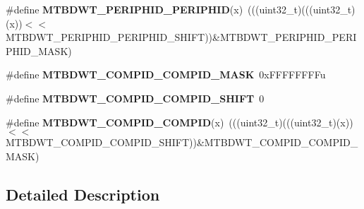 \begin{DoxyCompactItemize}
\item 
\mbox{\label{group___m_t_b_d_w_t___register___masks_ga85beaf9ed0fda0463c678867e53e691d}} 
\#define {\bfseries M\+T\+B\+D\+W\+T\+\_\+\+P\+E\+R\+I\+P\+H\+I\+D\+\_\+\+P\+E\+R\+I\+P\+H\+ID}(x)~(((uint32\+\_\+t)(((uint32\+\_\+t)(x))$<$$<$M\+T\+B\+D\+W\+T\+\_\+\+P\+E\+R\+I\+P\+H\+I\+D\+\_\+\+P\+E\+R\+I\+P\+H\+I\+D\+\_\+\+S\+H\+I\+FT))\&M\+T\+B\+D\+W\+T\+\_\+\+P\+E\+R\+I\+P\+H\+I\+D\+\_\+\+P\+E\+R\+I\+P\+H\+I\+D\+\_\+\+M\+A\+SK)
\item 
\mbox{\label{group___m_t_b_d_w_t___register___masks_ga6b80c05493bf46a1572b3f25fda4764b}} 
\#define {\bfseries M\+T\+B\+D\+W\+T\+\_\+\+C\+O\+M\+P\+I\+D\+\_\+\+C\+O\+M\+P\+I\+D\+\_\+\+M\+A\+SK}~0x\+F\+F\+F\+F\+F\+F\+F\+Fu
\item 
\mbox{\label{group___m_t_b_d_w_t___register___masks_ga26fe709d00d1433ca5a041dc307adfaa}} 
\#define {\bfseries M\+T\+B\+D\+W\+T\+\_\+\+C\+O\+M\+P\+I\+D\+\_\+\+C\+O\+M\+P\+I\+D\+\_\+\+S\+H\+I\+FT}~0
\item 
\mbox{\label{group___m_t_b_d_w_t___register___masks_ga96051e4614a093622983f79511da83b1}} 
\#define {\bfseries M\+T\+B\+D\+W\+T\+\_\+\+C\+O\+M\+P\+I\+D\+\_\+\+C\+O\+M\+P\+ID}(x)~(((uint32\+\_\+t)(((uint32\+\_\+t)(x))$<$$<$M\+T\+B\+D\+W\+T\+\_\+\+C\+O\+M\+P\+I\+D\+\_\+\+C\+O\+M\+P\+I\+D\+\_\+\+S\+H\+I\+FT))\&M\+T\+B\+D\+W\+T\+\_\+\+C\+O\+M\+P\+I\+D\+\_\+\+C\+O\+M\+P\+I\+D\+\_\+\+M\+A\+SK)
\end{DoxyCompactItemize}


\subsection{Detailed Description}
